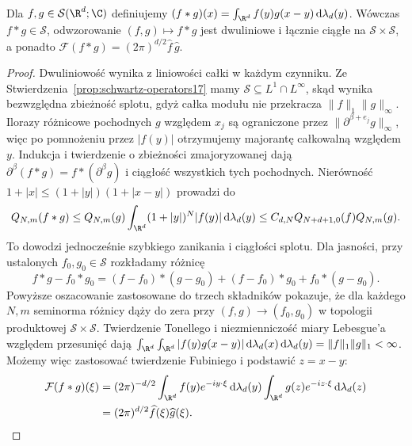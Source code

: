 \begin{stwierdzenie}
\label{prop:convolution-schwartz17}
Dla $f,g\in\mathcal S(\R^d;\C)$ definiujemy
$(f*g)(x)=\int_{\R^d}f(y)g(x-y)\,\mathrm d\lambda_d(y)$.
Wówczas $f*g\in\mathcal S$, odwzorowanie
$(f,g)\mapsto f*g$ jest dwuliniowe i łącznie ciągłe
na $\mathcal S\times\mathcal S$, a ponadto
$\mathcal F(f*g)=(2\pi)^{d/2}\widehat f\,\widehat g$.
\end{stwierdzenie}
\begin{proof}
Dwuliniowość wynika z liniowości całki w każdym
czynniku. Ze Stwierdzenia~\ref{prop:schwartz-operators17}
mamy $\mathcal S\subseteq L^1\cap L^\infty$, skąd wynika
bezwzględna zbieżność splotu, gdyż całka modułu
nie przekracza $\|f\|_1\|g\|_\infty$.
Ilorazy różnicowe pochodnych $g$ względem $x_j$
są ograniczone przez $\|\partial^{\beta+e_j}g\|_\infty$,
więc po pomnożeniu przez $|f(y)|$ otrzymujemy majorantę
całkowalną względem $y$. Indukcja i twierdzenie o zbieżności
zmajoryzowanej dają $\partial^\beta(f*g)=f*(\partial^\beta g)$
i ciągłość wszystkich tych pochodnych.
Nierówność $1+|x|\le(1+|y|)(1+|x-y|)$ prowadzi do
\[
 Q_{N,m}(f*g)\le Q_{N,m}(g)
 \int_{\R^d}(1+|y|)^N|f(y)|\,\mathrm d\lambda_d(y)
 \le C_{d,N}Q_{N+d+1,0}(f)Q_{N,m}(g).
\]
To dowodzi jednocześnie szybkiego zanikania i ciągłości
splotu. Dla jasności, przy ustalonych $f_0,g_0\in\mathcal S$
rozkładamy różnicę
\[
 f*g-f_0*g_0=(f-f_0)*(g-g_0)
 +(f-f_0)*g_0+f_0*(g-g_0).
\]
Powyższe oszacowanie zastosowane do trzech składników
pokazuje, że dla każdego $N,m$ seminorma różnicy
dąży do zera przy $(f,g)\to(f_0,g_0)$ w topologii
produktowej $\mathcal S\times\mathcal S$.
Twierdzenie Tonellego i niezmienniczość miary Lebesgue'a
względem przesunięć dają
$\int_{\R^d}\int_{\R^d}|f(y)g(x-y)|\,\mathrm d\lambda_d(x)
\,\mathrm d\lambda_d(y)=\|f\|_1\|g\|_1<\infty$.
Możemy więc zastosować twierdzenie Fubiniego i podstawić $z=x-y$:
\[
\begin{aligned}
\mathcal F(f*g)(\xi)
&=(2\pi)^{-d/2}
\int_{\R^d} f(y)e^{-iy\cdot\xi}\,\mathrm d\lambda_d(y)
\int_{\R^d}g(z)e^{-iz\cdot\xi}\,\mathrm d\lambda_d(z)\\
&=(2\pi)^{d/2}\widehat f(\xi)\widehat g(\xi).
\end{aligned}
\]
\end{proof}

